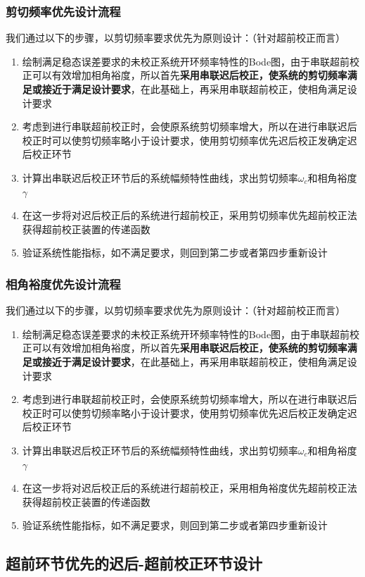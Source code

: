 \subsubsection{剪切频率优先设计流程}
我们通过以下的步骤，以剪切频率要求优先为原则设计：（针对超前校正而言）
\begin{enumerate}
    \item 绘制满足稳态误差要求的未校正系统开环频率特性的Bode图，由于串联超前校正可以有效增加相角裕度，所以首先\textbf{采用串联迟后校正，使系统的剪切频率满足或接近于满足设计要求}，在此基础上，再采用串联超前校正，使相角满足设计要求
    \item 考虑到进行串联超前校正时，会使原系统剪切频率增大，所以在进行串联迟后校正时可以使剪切频率略小于设计要求，使用剪切频率优先迟后校正发确定迟后校正环节
    \item 计算出串联迟后校正环节后的系统幅频特性曲线，求出剪切频率$\omega_c$和相角裕度$\gamma$
    \item 在这一步将对迟后校正后的系统进行超前校正，采用剪切频率优先超前校正法获得超前校正装置的传递函数
    \item 验证系统性能指标，如不满足要求，则回到第二步或者第四步重新设计
\end{enumerate}

\subsubsection{相角裕度优先设计流程}
我们通过以下的步骤，以剪切频率要求优先为原则设计：（针对超前校正而言）
\begin{enumerate}
    \item 绘制满足稳态误差要求的未校正系统开环频率特性的Bode图，由于串联超前校正可以有效增加相角裕度，所以首先\textbf{采用串联迟后校正，使系统的剪切频率满足或接近于满足设计要求}，在此基础上，再采用串联超前校正，使相角满足设计要求
    \item 考虑到进行串联超前校正时，会使原系统剪切频率增大，所以在进行串联迟后校正时可以使剪切频率略小于设计要求，使用剪切频率优先迟后校正发确定迟后校正环节
    \item 计算出串联迟后校正环节后的系统幅频特性曲线，求出剪切频率$\omega_c$和相角裕度$\gamma$
    \item 在这一步将对迟后校正后的系统进行超前校正，采用相角裕度优先超前校正法获得超前校正装置的传递函数
    \item 验证系统性能指标，如不满足要求，则回到第二步或者第四步重新设计
\end{enumerate}

\subsection{超前环节优先的迟后-超前校正环节设计}

